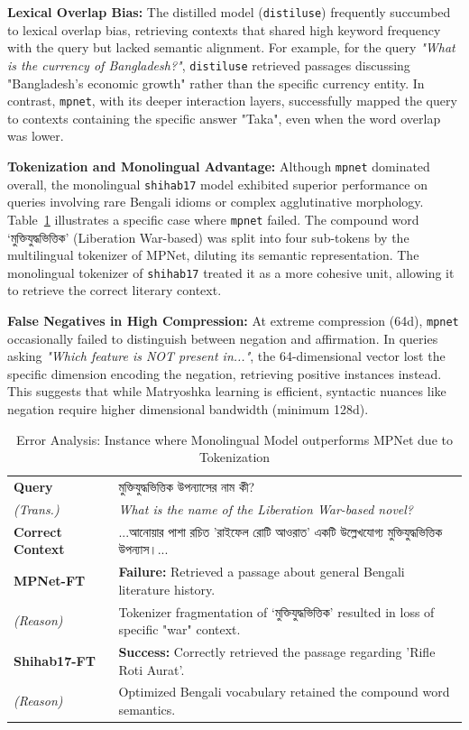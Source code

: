 \documentclass[acmsmall,screen,review]{acmart}
\newcommand{\bn}[1]{{\bengalifont #1}}
\begin{document}
\textbf{Lexical Overlap Bias:} The distilled model (\texttt{distiluse}) frequently succumbed to lexical overlap bias, retrieving contexts that shared high keyword frequency with the query but lacked semantic alignment. For example, for the query \textit{"What is the currency of Bangladesh?"}, \texttt{distiluse} retrieved passages discussing "Bangladesh's economic growth" rather than the specific currency entity. In contrast, \texttt{mpnet}, with its deeper interaction layers, successfully mapped the query to contexts containing the specific answer "Taka", even when the word overlap was lower.

\textbf{Tokenization and Monolingual Advantage:} Although \texttt{mpnet} dominated overall, the monolingual \texttt{shihab17} model exhibited superior performance on queries involving rare Bengali idioms or complex agglutinative morphology.
Table~\ref{tab:error_analysis} illustrates a specific case where \texttt{mpnet} failed. The compound word \bn{‘মুক্তিযুদ্ধভিত্তিক’} (Liberation War-based) was split into four sub-tokens by the multilingual tokenizer of MPNet, diluting its semantic representation. The monolingual tokenizer of \texttt{shihab17} treated it as a more cohesive unit, allowing it to retrieve the correct literary context.

\textbf{False Negatives in High Compression:} At extreme compression (64d), \texttt{mpnet} occasionally failed to distinguish between negation and affirmation. In queries asking \textit{"Which feature is NOT present in..."}, the 64-dimensional vector lost the specific dimension encoding the negation, retrieving positive instances instead. This suggests that while Matryoshka learning is efficient, syntactic nuances like negation require higher dimensional bandwidth (minimum 128d).

\begin{table}[h]
    \caption{Error Analysis: Instance where Monolingual Model outperforms MPNet due to Tokenization}
    \label{tab:error_analysis}
    \small
    \begin{tabularx}{\linewidth}{p{1.5cm}X}
        \toprule
        \textbf{Query} & \bn{মুক্তিযুদ্ধভিত্তিক উপন্যাসের নাম কী?} \\
        \textit{(Trans.)} & \textit{What is the name of the Liberation War-based novel?} \\
        \midrule
        \textbf{Correct Context} & ...\bn{আনোয়ার পাশা রচিত 'রাইফেল রোটি আওরাত' একটি উল্লেখযোগ্য মুক্তিযুদ্ধভিত্তিক উপন্যাস।...} \\
        \midrule
        \textbf{MPNet-FT} & \textbf{Failure:} Retrieved a passage about general Bengali literature history. \\
        \textit{(Reason)} & Tokenizer fragmentation of \bn{‘মুক্তিযুদ্ধভিত্তিক’} resulted in loss of specific "war" context. \\
        \midrule
        \textbf{Shihab17-FT} & \textbf{Success:} Correctly retrieved the passage regarding 'Rifle Roti Aurat'. \\
        \textit{(Reason)} & Optimized Bengali vocabulary retained the compound word semantics. \\
        \bottomrule
    \end{tabularx}
\end{table}
\end{document}
